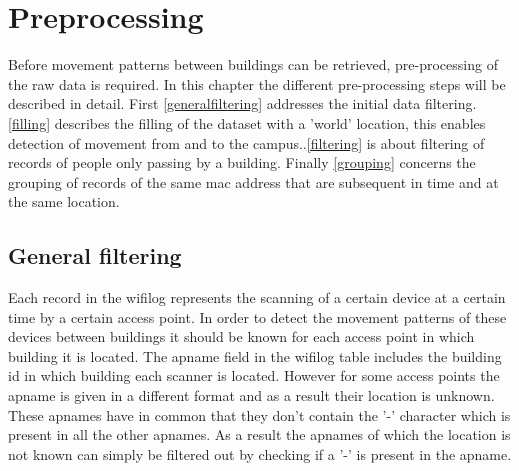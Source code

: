 \chapter{Preprocessing}\label{preprocessing}
Before movement patterns between buildings can be retrieved, pre-processing of the raw data is required. In this chapter the different pre-processing steps will be described in detail. First \autoref{generalfiltering} addresses the initial data filtering. \autoref{filling} describes the filling of the dataset with a 'world' location, this enables detection of movement from and to the campus..\autoref{filtering} is about filtering of records of people only passing by a building. Finally \autoref{grouping} concerns the grouping of records of the same mac address that are subsequent in time and at the same location.\\

\section{General filtering}\label{generalfiltering}
Each record in the wifilog represents the scanning of a certain device at a certain time by a certain access point. In order to detect the movement patterns of these devices between buildings it should be known for each access point in which building it is located. The apname field in the wifilog table includes the building id in which building each scanner is located. However for some access points the apname is given in a different format and as a result their location is unknown. These apnames have in common that they don’t contain the '-' character which is present in all the other apnames. As a result the apnames of which the location is not known can simply be filtered out by checking if a '-' is present in the apname. 


